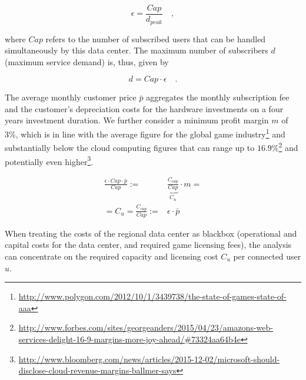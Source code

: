 \begin{equation}
	\epsilon = \frac{Cap}{d_{peak}} \quad ,
\end{equation}

where $Cap$ refers to the number of subscribed users that can be handled simultaneously by this data center. The maximum number of subscribers $d$ (maximum service demand) is, thus, given by

\begin{equation}
	 d = Cap \cdot \epsilon \quad .
\end{equation}

The average monthly customer price $\bar{p}$ aggregates the monthly subscription fee and the customer's depreciation costs for the hardware investments on a four years investment duration. We further consider a minimum profit margin $m$ of $3 \%$, which is in line with the average figure for the global game industry\footnote{\url{http://www.polygon.com/2012/10/1/3439738/the-state-of-games-state-of-aaa}} and substantially below the cloud computing figures that can range up to $16.9\%$\footnote{\url{http://www.forbes.com/sites/georgeanders/2015/04/23/amazons-web-services-delight-16-9-margins-more-joy-ahead/\#73324aa64b4e}} and potentially even higher\footnote{\url{http://www.bloomberg.com/news/articles/2015-12-02/microsoft-should-disclose-cloud-revenue-margins-ballmer-says}}.


\begin{align} \label{eq:computational_efficiency}
	\frac{\epsilon \cdot Cap \cdot \bar{p}}{Cap} :=& \underbrace{\frac{C_{cap}}{Cap}}_{C_{u}} \cdot m =\\
	= C_{u} = \frac{C_{cap}}{Cap} :=& \epsilon \cdot \bar{p}
\end{align}

When treating the costs of the regional data center as blackbox (operational and capital costs for the data center, and required game licensing fees), the analysis can concentrate on the required capacity and licensing cost $C_{u}$ per connected user $u$.


